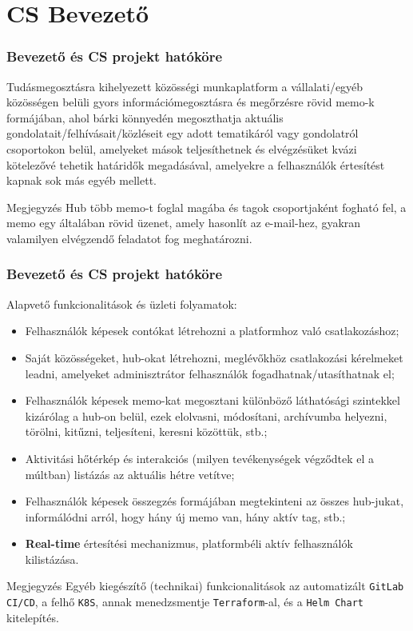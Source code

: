 \section{CS Bevezető}

\begin{frame}
    \frametitle{Bevezető és CS projekt hatóköre}

    Tudásmegosztásra kihelyezett közösségi munkaplatform a vállalati/egyéb közösségen belüli gyors információmegosztásra és megőrzésre rövid memo-k formájában, ahol bárki könnyedén megoszthatja aktuális gondolatait/felhívásait/közléseit egy adott tematikáról vagy gondolatról csoportokon belül, amelyeket mások teljesíthetnek és elvégzésüket kvázi kötelezővé tehetik határidők megadásával, amelyekre a felhasználók értesítést kapnak sok más egyéb mellett.

    \medbreak

    \begin{block}{Megjegyzés}
        Hub több memo-t foglal magába és tagok csoportjaként fogható fel, a memo egy általában rövid üzenet, amely hasonlít az e-mail-hez, gyakran valamilyen elvégzendő feladatot fog meghatározni.
    \end{block}
\end{frame}

\begin{frame}
    \frametitle{Bevezető és CS projekt hatóköre}

    Alapvető funkcionalitások és üzleti folyamatok:
    \begin{itemize}
        \item Felhasználók képesek contókat létrehozni a platformhoz való csatlakozáshoz;
        \item Saját közösségeket, hub-okat létrehozni, meglévőkhöz csatlakozási kérelmeket leadni, amelyeket adminisztrátor felhasználók fogadhatnak/utasíthatnak el;
        \item Felhasználók képesek memo-kat megosztani különböző láthatósági szintekkel kizárólag a hub-on belül, ezek elolvasni, módosítani, archívumba helyezni, törölni, kitűzni, teljesíteni, keresni közöttük, stb.;
        \item Aktivitási hőtérkép és interakciós (milyen tevékenységek végződtek el a múltban) listázás az aktuális hétre vetítve;
        \item Felhasználók képesek összegzés formájában megtekinteni az összes hub-jukat, informálódni arról, hogy hány új memo van, hány aktív tag, stb.;
        \item \textbf{Real-time} értesítési mechanizmus, platformbéli aktív felhasználók kilistázása.
    \end{itemize}

    \begin{block}{Megjegyzés}
        Egyéb kiegészítő (technikai) funkcionalitások az automatizált \texttt{GitLab CI/CD}, a felhő \texttt{K8S}, annak menedzsmentje \texttt{Terraform}-al, és a \texttt{Helm Chart} kitelepítés.
    \end{block}
\end{frame}